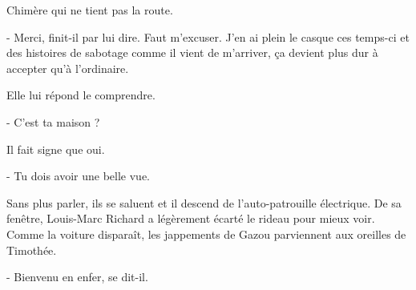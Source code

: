 Chimère qui ne tient pas la route.

- Merci, finit-il par lui dire. Faut m’excuser. J’en ai plein le casque ces temps-ci et des histoires de sabotage comme il vient de m’arriver, ça devient plus dur à accepter qu’à l’ordinaire.

Elle lui répond le comprendre.

- C’est ta maison ?

Il fait signe que oui.

- Tu dois avoir une belle vue.

Sans plus parler, ils se saluent et il descend de l’auto-patrouille électrique. De sa fenêtre, Louis-Marc Richard a légèrement écarté le rideau pour mieux voir. Comme la voiture disparaît, les jappements de Gazou parviennent aux oreilles de Timothée.

- Bienvenu en enfer, se dit-il.